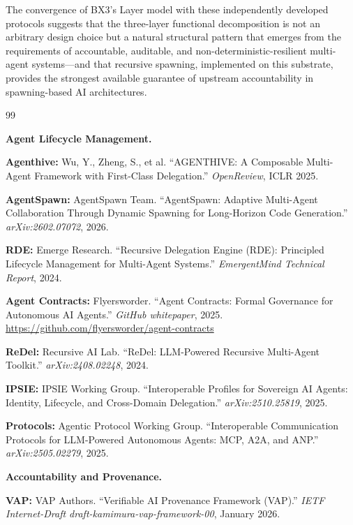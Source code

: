 The convergence of BX3's Layer model with these independently developed protocols suggests that the three-layer functional decomposition is not an arbitrary design choice but a natural structural pattern that emerges from the requirements of accountable, auditable, and non-deterministic-resilient multi-agent systems—and that recursive spawning, implemented on this substrate, provides the strongest available guarantee of upstream accountability in spawning-based AI architectures.

\begin{thebibliography}{99}

\smallskip\noindent\textbf{Agent Lifecycle Management.}

\textbf{Agenthive:} Wu, Y., Zheng, S., et al. ``AGENTHIVE: A Composable Multi-Agent Framework with First-Class Delegation.'' \emph{OpenReview}, ICLR 2025.

\textbf{AgentSpawn:} AgentSpawn Team. ``AgentSpawn: Adaptive Multi-Agent Collaboration Through Dynamic Spawning for Long-Horizon Code Generation.'' \emph{arXiv:2602.07072}, 2026.

\textbf{RDE:} Emerge Research. ``Recursive Delegation Engine (RDE): Principled Lifecycle Management for Multi-Agent Systems.'' \emph{EmergentMind Technical Report}, 2024.

\textbf{Agent Contracts:} Flyersworder. ``Agent Contracts: Formal Governance for Autonomous AI Agents.'' \emph{GitHub whitepaper}, 2025. \url{https://github.com/flyersworder/agent-contracts}

\textbf{ReDel:} Recursive AI Lab. ``ReDel: LLM-Powered Recursive Multi-Agent Toolkit.'' \emph{arXiv:2408.02248}, 2024.

\textbf{IPSIE:} IPSIE Working Group. ``Interoperable Profiles for Sovereign AI Agents: Identity, Lifecycle, and Cross-Domain Delegation.'' \emph{arXiv:2510.25819}, 2025.

\textbf{Protocols:} Agentic Protocol Working Group. ``Interoperable Communication Protocols for LLM-Powered Autonomous Agents: MCP, A2A, and ANP.'' \emph{arXiv:2505.02279}, 2025.

\smallskip\noindent\textbf{Accountability and Provenance.}

\textbf{VAP:} VAP Authors. ``Verifiable AI Provenance Framework (VAP).'' \emph{IETF Internet-Draft draft-kamimura-vap-framework-00}, January 2026.


\end{thebibliography}
